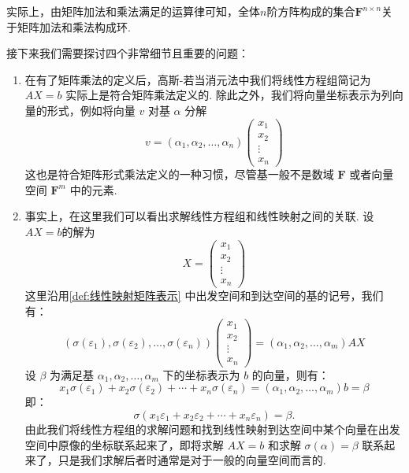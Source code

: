 实际上，由矩阵加法和乘法满足的运算律可知，全体$n$阶方阵构成的集合$\mathbf{F}^{n\times n}$关于矩阵加法和乘法构成环.

接下来我们需要探讨四个非常细节且重要的问题：
\begin{enumerate}
    \item 在有了矩阵乘法的定义后，高斯-若当消元法中我们将线性方程组简记为 $AX = b$ 实际上是符合矩阵乘法定义的. 除此之外，我们将向量坐标表示为列向量的形式，例如将向量 $v$ 对基 $\alpha$ 分解
          \[v=(\alpha_1,\alpha_2,\ldots,\alpha_n)\begin{pmatrix}
                  x_1 \\ x_2 \\ \vdots \\ x_n
              \end{pmatrix}\]
          这也是符合矩阵形式乘法定义的一种习惯，尽管基一般不是数域 $\mathbf{F}$ 或者向量空间 $\mathbf{F}^m$ 中的元素.

    \item 事实上，在这里我们可以看出求解线性方程组和线性映射之间的关联. 设$AX=b$的解为
          \[X=\begin{pmatrix}
                  x_1 \\ x_2 \\ \vdots \\ x_n
              \end{pmatrix}\]
          这里沿用\autoref{def:线性映射矩阵表示} 中出发空间和到达空间的基的记号，我们有：
          \begin{equation}\label{eq:7:方程组与核空间1}
              (\sigma(\varepsilon_1),\sigma(\varepsilon_2),\ldots,\sigma(\varepsilon_n))\begin{pmatrix}
                  x_1 \\ x_2 \\ \vdots \\ x_n
              \end{pmatrix}=(\alpha_1,\alpha_2,\ldots,\alpha_m)AX
          \end{equation}
          设 $\beta$ 为满足基 $\alpha_1,\alpha_2,\ldots,\alpha_m$ 下的坐标表示为 $b$ 的向量，则有：
          \[
              x_1\sigma(\varepsilon_1)+x_2\sigma(\varepsilon_2)+\cdots+x_n\sigma(\varepsilon_n)=(\alpha_1,\alpha_2,\ldots,\alpha_m)b=\beta
          \]
          即：
          \begin{equation}\label{eq:7:方程组与核空间2}
              \sigma(x_1\varepsilon_1+x_2\varepsilon_2+\cdots+x_n\varepsilon_n)=\beta.
          \end{equation}
          由此我们将线性方程组的求解问题和找到线性映射到达空间中某个向量在出发空间中原像的坐标联系起来了，即将求解 $AX = b$ 和求解 $\sigma(\alpha) = \beta$ 联系起来了，只是我们求解后者时通常是对于一般的向量空间而言的.


\end{enumerate}
